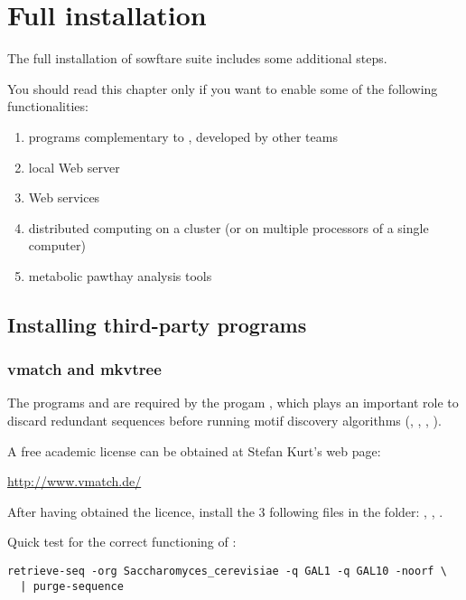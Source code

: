 \documentclass[12pt,a4paper, oneside]{scrreprt} %
\begin{document}
\chapter{Full installation}

The full installation of \RSAT sowftare suite includes some additional steps.

You should read this chapter only if you want to enable some of the
following functionalities:
\begin{enumerate}
  \item programs complementary to \RSAT, developed by other teams
  \item local Web server
  \item Web services
  \item distributed computing on a cluster (or on multiple processors
    of a single computer)
  \item metabolic pawthay analysis tools
\end{enumerate}

\section{Installing third-party programs}

\subsection{vmatch and mkvtree}

The programs  and  are required by
the \RSAT progam , which plays an important
role to discard redundant sequences before running motif discovery
algorithms (, ,
, ).

A free academic license can be obtained at Stefan Kurt's web page:

\url{http://www.vmatch.de/}

After having obtained the licence, install the 3 following files in
the  folder: , ,
.

Quick test for the correct functioning of :

\begin{lstlisting}
retrieve-seq -org Saccharomyces_cerevisiae -q GAL1 -q GAL10 -noorf \
  | purge-sequence
\end{lstlisting}
\end{document}
